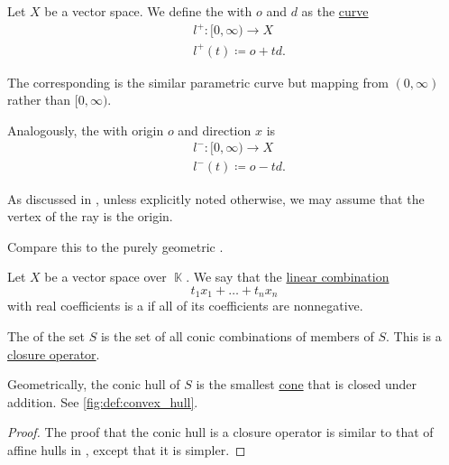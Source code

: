 \begin{definition}\label{def:geometric_ray}\mimprovised
  Let \( X \) be a  vector space. We define the  with  \( o \) and  \( d \) as the \hyperref[def:parametric_curve]{curve}
  \begin{equation*}
    \begin{aligned}
       &l^+: [0, \infty) \to X \\
       &l^+(t) \coloneqq o + td.
    \end{aligned}
  \end{equation*}

  The corresponding  is the similar parametric curve but mapping from \( (0, \infty) \) rather than \( [0, \infty) \).

  Analogously, the  with origin \( o \) and direction \( x \) is
  \begin{equation*}
    \begin{aligned}
       &l^-: [0, \infty) \to X \\
       &l^-(t) \coloneqq o - td.
    \end{aligned}
  \end{equation*}

  As discussed in , unless explicitly noted otherwise, we may assume that the vertex of the ray is the origin.

  Compare this to the purely geometric .
\end{definition}

\begin{definition}\label{def:conic_hull}\mimprovised
  Let \( X \) be a vector space over \( \BbbK \). We say that the \hyperref[rem:linear_combinations]{linear combination}
  \begin{equation*}
    t_1 x_1 + \ldots + t_n x_n
  \end{equation*}
  with real coefficients is a  if all of its coefficients are nonnegative.

  The  of the set \( S \) is the set of all conic combinations of members of \( S \). This is a \hyperref[def:closure_operator]{closure operator}.

  Geometrically, the conic hull of \( S \) is the smallest \hyperref[def:geometric_cone]{cone} that is closed under addition. See \cref{fig:def:convex_hull}.
\end{definition}
\begin{proof}
  The proof that the conic hull is a closure operator is similar to that of affine hulls in , except that it is simpler.
\end{proof}

